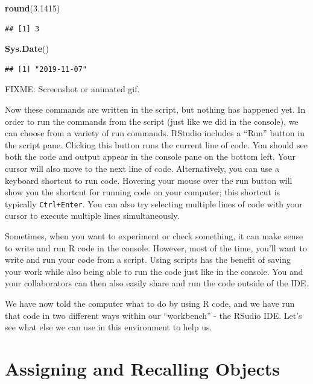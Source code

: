 \documentclass[]{Nemilov}
\newenvironment{Shaded}{\begin{snugshade}}{\end{snugshade}}
\newcommand{\FloatTok}[1]{\textcolor[rgb]{0.00,0.00,0.81}{#1}}
\newcommand{\KeywordTok}[1]{\textcolor[rgb]{0.13,0.29,0.53}{\textbf{#1}}}
\newcommand{\NormalTok}[1]{#1}
\begin{document}
\begin{Shaded}
\begin{Highlighting}[]
\KeywordTok{round}\NormalTok{(}\FloatTok{3.1415}\NormalTok{)}
\end{Highlighting}
\end{Shaded}

\begin{verbatim}
## [1] 3
\end{verbatim}

\begin{Shaded}
\begin{Highlighting}[]
\KeywordTok{Sys.Date}\NormalTok{()}
\end{Highlighting}
\end{Shaded}

\begin{verbatim}
## [1] "2019-11-07"
\end{verbatim}

FIXME: Screenshot or animated gif.

Now these commands are written in the script, but nothing has happened yet.
In order to run the commands from the script (just like we did in the console),
we can choose from a variety of run commands. RStudio includes a ``Run'' button
in the
script pane. Clicking this button runs the current line of code.
You should see both the code and output appear in the console pane on the
bottom left. Your cursor will also move to the next line of code.
Alternatively, you can use a keyboard shortcut to run code.
Hovering your mouse over the run button will show you the shortcut for
running code on your computer; this shortcut is typically \texttt{Ctrl+Enter}.
You can also try selecting multiple lines of code with your cursor to execute
multiple lines simultaneously.

Sometimes, when you want to experiment or check something, it can make sense
to write and run R code in the console. However, most of the time, you'll
want to write and run your code from a script. Using
scripts has the benefit of saving your work while also being able to run
the code just like in the console. You and your collaborators can then also
easily share and run the code outside of the IDE.

We have now told the computer what to do by using R code, and we have run that
code in two different ways within our ``workbench'' - the RSudio IDE. Let's
see what else we can use in this environment to help us.

\hypertarget{r-getting-started-objects}{%
\section{Assigning and Recalling Objects}\label{r-getting-started-objects}}
\end{document}
